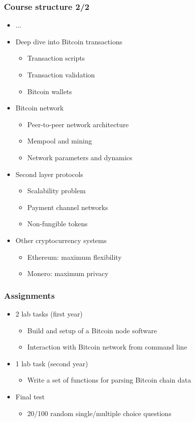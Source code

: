 \documentclass{beamer}
\begin{document}
\begin{frame}
  \frametitle{Course structure 2/2}
  \begin{itemize}
  \item[] ...
  \item Deep dive into Bitcoin transactions
    \begin{itemize}
    \item Transaction scripts
    \item Transaction validation
    \item Bitcoin wallets
    \end{itemize}
  \item Bitcoin network
    \begin{itemize}
    \item Peer-to-peer network architecture
    \item Mempool and mining
    \item Network parameters and dynamics
    \end{itemize}
  \item Second layer protocols
    \begin{itemize}
    \item Scalability problem
    \item Payment channel networks
    \item Non-fungible tokens
    \end{itemize}
  \item Other cryptocurrency systems
    \begin{itemize}
    \item Ethereum: maximum flexibility
    \item Monero: maximum privacy
    \end{itemize}
  \end{itemize}
\end{frame}

\begin{frame}
  \frametitle{Assignments}
  \begin{itemize}
  \item 2 lab tasks (first year)
    \begin{itemize}
    \item Build and setup of a Bitcoin node software
    \item Interaction with Bitcoin network from command line
    \end{itemize}
  \item 1 lab task (second year)
    \begin{itemize}
    \item Write a set of functions for parsing Bitcoin chain data
    \end{itemize}
  \item Final test
    \begin{itemize}
    \item 20/100 random single/multiple choice questions 
    \end{itemize}
  \end{itemize}
\end{frame}
\end{document}

